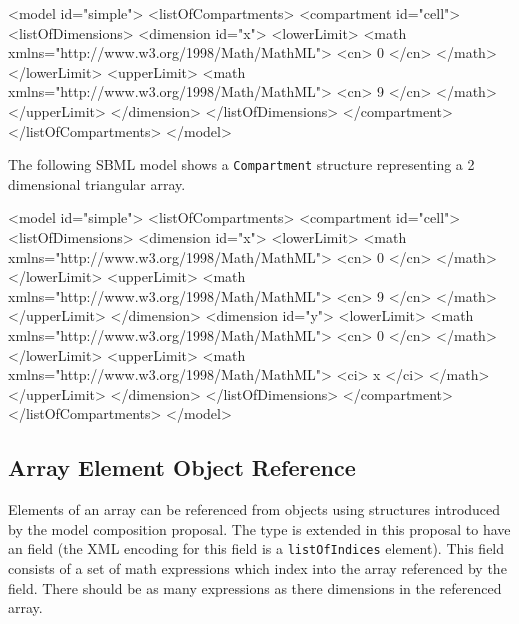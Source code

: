 \documentclass{cekarticle}
\begin{document}
\begin{example}
<model id="simple">
    <listOfCompartments>
        <compartment id="cell">
            <listOfDimensions>
                <dimension id="x">
                    <lowerLimit>
                        <math xmlns="http://www.w3.org/1998/Math/MathML">
                            <cn> 0 </cn>
                        </math>
                    </lowerLimit>
                    <upperLimit>
                        <math xmlns="http://www.w3.org/1998/Math/MathML">
                            <cn> 9 </cn>
                        </math>
                    </upperLimit>
                </dimension>
            </listOfDimensions>
        </compartment>
    </listOfCompartments>
</model>
\end{example}

The following SBML model shows a \texttt{Compartment}
structure representing a 2 dimensional triangular array.

\begin{example}
<model id="simple">
    <listOfCompartments>
        <compartment id="cell">
            <listOfDimensions>
                <dimension id="x">
                    <lowerLimit>
                        <math xmlns="http://www.w3.org/1998/Math/MathML">
                            <cn> 0 </cn>
                        </math>
                    </lowerLimit>
                    <upperLimit>
                        <math xmlns="http://www.w3.org/1998/Math/MathML">
                            <cn> 9 </cn>
                        </math>
                    </upperLimit>
                </dimension>
                <dimension id="y">
                    <lowerLimit>
                        <math xmlns="http://www.w3.org/1998/Math/MathML">
                            <cn> 0 </cn>
                        </math>
                    </lowerLimit>
                    <upperLimit>
                        <math xmlns="http://www.w3.org/1998/Math/MathML">
                            <ci> x </ci>
                        </math>
                    </upperLimit>
                </dimension>
            </listOfDimensions>
        </compartment>
    </listOfCompartments>
</model>
\end{example}

\subsection{Array Element Object Reference}
\label{sec:arrayLinks}
Elements of an array can be referenced from objects using  structures introduced by the model composition proposal.
The  type is extended in this proposal to have an  field (the XML encoding for this field is a \texttt{listOfIndices} element).
This field consists of a set of math expressions which index into the array referenced by the  field.  There should be
as many expressions as there dimensions in the referenced array.
\end{document}
